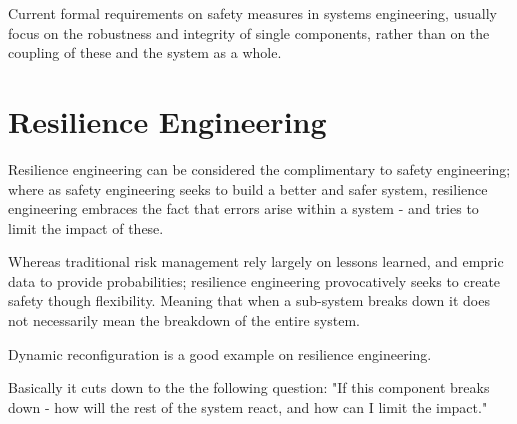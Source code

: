 

Current formal requirements on safety measures in systems engineering, usually focus on the robustness and integrity of single components, rather than on the coupling of these and the system as a whole.
\section{Resilience Engineering}
\label{sec:resilience_engineering}
Resilience engineering can be considered the complimentary to safety engineering; where as safety engineering seeks to build a better and safer system, resilience engineering embraces the fact that errors arise within a system - and tries to limit the impact of these.

Whereas traditional risk management rely largely on lessons learned, and empric data to provide probabilities; resilience engineering provocatively seeks to create safety though flexibility. Meaning that when a sub-system breaks down it does not necessarily mean the breakdown of the entire system.

Dynamic reconfiguration is a good example on resilience engineering.

Basically it cuts down to the the following question: "If this component breaks down - how will the rest of the system react, and how can I limit the impact."



